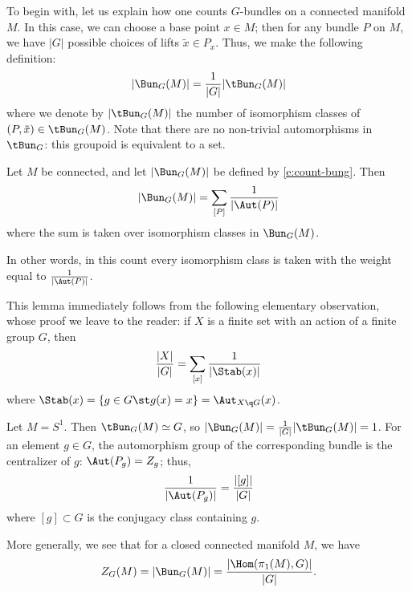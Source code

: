 To begin with, let us explain how one counts $G$-bundles on a connected
manifold $M$. In this case, we can choose a base point $x\in M$; then for any
bundle $P$ on $M$, we have $|G|$ possible choices of lifts $\tilde x\in P_x$.
Thus, we make the following definition:
\begin{equation}\label{e:count-bung}
  |\Bun_G(M)|=\frac{1}{|G|} |\tBun_G(M)|
\end{equation}
where we denote by $|\tBun_G(M)|$ the number of isomorphism classes of
$(P,\tilde x)\in \tBun_G(M)$. Note that there are no non-trivial
automorphisms in $\tBun_G$: this groupoid is equivalent to a set.

\begin{lemma}\label{l:count_aut}
  Let $M$ be connected, and let $|\Bun_G(M)|$ be defined by
  \eqref{e:count-bung}. Then
  $$
    |\Bun_G(M)|=\sum_{[P]} \frac{1}{|\Aut(P)|}
  $$
  where the sum is taken over isomorphism classes in $\Bun_G(M)$.
\end{lemma}
In other words, in this count every isomorphism class is taken with
the weight equal to $\frac{1}{|\Aut(P)|}$.

This lemma immediately follows from the following elementary observation,
whose proof we leave to the reader: if $X$ is a finite set with an action of a
finite group $G$, then
$$
  \frac{|X|}{|G|}=\sum_{[x]}\frac{1}{|\Stab(x)|}
$$
where $\Stab(x)=\{g\in G\st g(x)=x\}=\Aut_{X\q G}(x)$.
\begin{example}\label{x:bun-circle}
  Let $M=S^1$. Then $\tBun_G(M)\simeq G$, so $|\Bun_G(M)|=\frac{1}{|G|}
  |\tBun_G(M)|=1$.
  For an element $g\in G$, the automorphism group of the corresponding bundle
  is the centralizer of $g$: $\Aut(P_g)=Z_g$; thus,
  $$
  \frac{1}{|\Aut(P_g)|}= \frac{|[g]|}{|G|}
  $$
  where $[g]\subset G$ is the conjugacy class containing $g$.
\end{example}

More generally, we see that for a closed connected manifold $M$, we have
\begin{equation}\label{e:dw-closed}
  Z_G(M)= |\Bun_G(M)|= \frac{|\Hom(\pi_1(M), G)|}{|G|}.
\end{equation}


